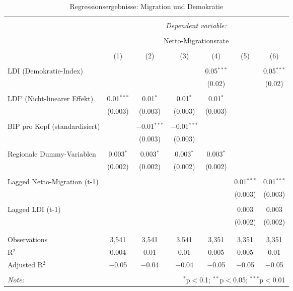 
\begin{table}[!htbp] \centering 
  \caption{Regressionsergebnisse: Migration und Demokratie} 
  \label{} 
\scriptsize 
\begin{tabular}{@{\extracolsep{2pt}}lcccccc} 
\\[-1.8ex]\hline 
\hline \\[-1.8ex] 
 & \multicolumn{6}{c}{\textit{Dependent variable:}} \\ 
\cline{2-7} 
\\[-1.8ex] & \multicolumn{6}{c}{Netto-Migrationsrate} \\ 
\\[-1.8ex] & (1) & (2) & (3) & (4) & (5) & (6)\\ 
\hline \\[-1.8ex] 
 LDI (Demokratie-Index) &  &  &  & 0.05$^{***}$ &  & 0.05$^{***}$ \\ 
  &  &  &  & (0.02) &  & (0.02) \\ 
  & & & & & & \\ 
 LDI² (Nicht-linearer Effekt) & 0.01$^{***}$ & 0.01$^{*}$ & 0.01$^{*}$ & 0.01$^{*}$ &  &  \\ 
  & (0.003) & (0.003) & (0.003) & (0.003) &  &  \\ 
  & & & & & & \\ 
 BIP pro Kopf (standardisiert) &  & $-$0.01$^{***}$ & $-$0.01$^{***}$ &  &  &  \\ 
  &  & (0.003) & (0.003) &  &  &  \\ 
  & & & & & & \\ 
 Regionale Dummy-Variablen & 0.003$^{*}$ & 0.003$^{*}$ & 0.003$^{*}$ & 0.003$^{*}$ &  &  \\ 
  & (0.002) & (0.002) & (0.002) & (0.002) &  &  \\ 
  & & & & & & \\ 
 Lagged Netto-Migration (t-1) &  &  &  &  & 0.01$^{***}$ & 0.01$^{***}$ \\ 
  &  &  &  &  & (0.003) & (0.003) \\ 
  & & & & & & \\ 
 Lagged LDI (t-1) &  &  &  &  & 0.003 & 0.003 \\ 
  &  &  &  &  & (0.002) & (0.002) \\ 
  & & & & & & \\ 
\hline \\[-1.8ex] 
Observations & 3,541 & 3,541 & 3,541 & 3,351 & 3,351 & 3,351 \\ 
R$^{2}$ & 0.004 & 0.01 & 0.01 & 0.005 & 0.005 & 0.01 \\ 
Adjusted R$^{2}$ & $-$0.05 & $-$0.04 & $-$0.04 & $-$0.05 & $-$0.05 & $-$0.05 \\ 
\hline 
\hline \\[-1.8ex] 
\textit{Note:}  & \multicolumn{6}{r}{$^{*}$p$<$0.1; $^{**}$p$<$0.05; $^{***}$p$<$0.01} \\ 
\end{tabular} 
\end{table} 

